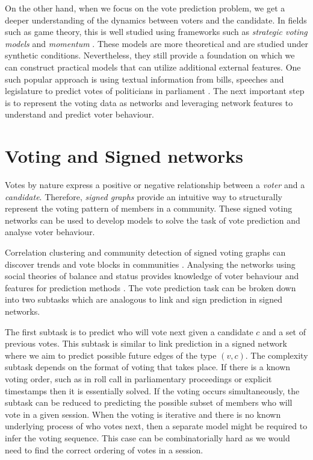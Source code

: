 On the other hand, when we focus on the vote prediction problem, we get a deeper understanding of the dynamics between voters and the candidate. In fields such as game theory, this is well studied using frameworks such as \textit{strategic voting models} and \textit{momentum} \cite{meir2020strategic,zou2015strategicDoodle,ali2006a,banerjee1992simple,tal2015a}. These models are more theoretical and are studied under synthetic conditions. Nevertheless, they still provide a foundation on which we can construct practical models that can utilize additional external features. One such popular approach is using textual information from bills, speeches and legislature to predict votes of politicians in parliament \cite{budhwar2018predicting,gerrish2011predicting}. The next important step is to represent the voting data as networks and leveraging network features to understand and predict voter behaviour.


\section{Voting and Signed networks}
\label{sec:voting-signed-networks}
Votes by nature express a positive or negative relationship between a \textit{voter} and a \textit{candidate}. Therefore, \textit{signed graphs} provide an intuitive way to structurally represent the voting pattern of members in a community. These signed voting networks can be used to develop models to solve the task of vote prediction and analyse voter behaviour.

Correlation clustering and community detection of signed voting graphs can discover trends and vote blocks in communities \cite{brito2020aBrazil,arinik2017signed}. Analysing the networks using social theories of balance and status provides knowledge of voter behaviour and features for prediction methods \cite{levorato2016brazilian,derr2018congressional}. The vote prediction task can be broken down into two subtasks which are analogous to link and sign prediction in signed networks. 

The first subtask is to predict who will vote next given a candidate $c$ and a set of previous votes. This subtask is similar to link prediction in a signed network where we aim to predict possible future edges of the type $(v,c)$. The complexity subtask depends on the format of voting that takes place. If there is a known voting order, such as in roll call in parliamentary proceedings or explicit timestamps then it is essentially solved. If the voting occurs simultaneously, the subtask can be reduced to predicting the possible subset of members who will vote in a given session. When the voting is iterative and there is no known underlying process of who votes next, then a separate model might be required to infer the voting sequence. This case can be combinatorially  hard as we would need to find the correct ordering of votes in a session.

